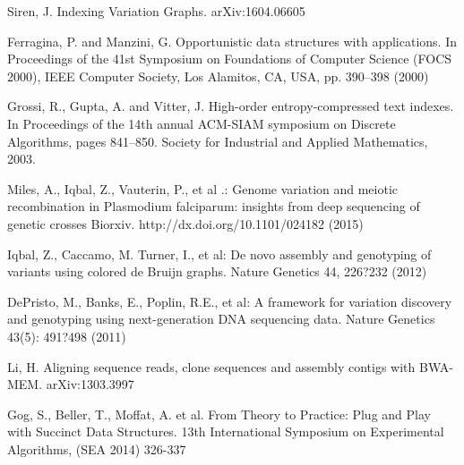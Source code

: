 \documentclass[runningheads,a4paper]{llncs}
\begin{document}
\begin{thebibliography}{4}
 Siren, J. Indexing Variation Graphs. 	arXiv:1604.06605 

 Ferragina, P. and Manzini, G. Opportunistic data structures with applications. In Proceedings of the 41st Symposium on Foundations of Computer Science (FOCS 2000), IEEE Computer Society, Los Alamitos, CA, USA, pp. 390–398 (2000)

 Grossi, R., Gupta, A. and Vitter, J. High-order entropy-compressed text indexes. In Proceedings of the 14th annual ACM-SIAM symposium on Discrete Algorithms, pages 841–850. Society for Industrial and Applied Mathematics, 2003.

 Miles, A., Iqbal, Z., Vauterin, P., et al .: Genome variation and meiotic recombination in Plasmodium falciparum: insights from deep sequencing of genetic crosses Biorxiv. http://dx.doi.org/10.1101/024182 (2015)

 Iqbal, Z., Caccamo, M. Turner, I.,  et al: De novo assembly and genotyping of variants using colored de Bruijn graphs. Nature Genetics  44, 226?232 (2012)

 DePristo, M., Banks, E., Poplin, R.E., et al: A framework for variation discovery and genotyping using next-generation DNA sequencing data. Nature Genetics 43(5): 491?498 (2011)

 Li, H. Aligning sequence reads, clone sequences and assembly contigs with BWA-MEM. 	arXiv:1303.3997

 Gog, S., Beller, T., Moffat, A. et al. From Theory to Practice: Plug and Play with Succinct Data Structures. 13th International Symposium on Experimental Algorithms, (SEA 2014) 326-337

\end{thebibliography}
\end{document}
